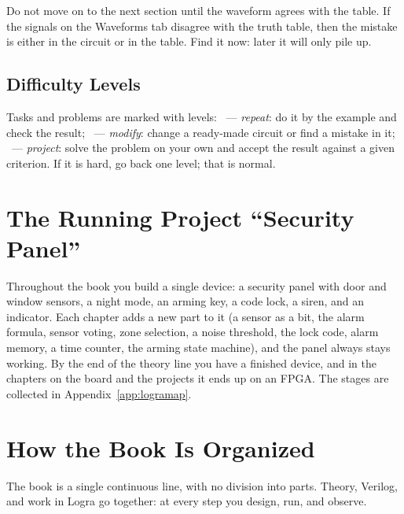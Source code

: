 \begin{infobox}
Do not move on to the next section until the waveform agrees with the table.
If the signals on the Waveforms tab disagree with the truth table, then the
mistake is either in the circuit or in the table. Find it now: later it will
only pile up.
\end{infobox}

\subsection*{Difficulty Levels}

Tasks and problems are marked with levels:
~--- \emph{repeat}: do it by the example and check the result;
~--- \emph{modify}: change a ready-made circuit or find a mistake in it;
~--- \emph{project}: solve the problem on your own and accept the
result against a given criterion. If it is hard, go back one level; that is
normal.

\section*{The Running Project ``Security Panel''}

Throughout the book you build a single device: a security panel with door and window
sensors, a night mode, an arming key, a code lock, a siren, and an indicator.
Each chapter adds a new part to it (a sensor as a bit, the alarm formula,
sensor voting, zone selection, a noise threshold, the lock code, alarm
memory, a time counter, the arming state machine), and the panel always
stays working. By the end of the theory line you have a finished device, and
in the chapters on the board and the projects it ends up on an FPGA. The stages are collected in
Appendix~\ref{app:logramap}.

\section*{How the Book Is Organized}

The book is a single continuous line, with no division into parts. Theory,
Verilog, and work in Logra go together: at every step you design, run, and
observe.

